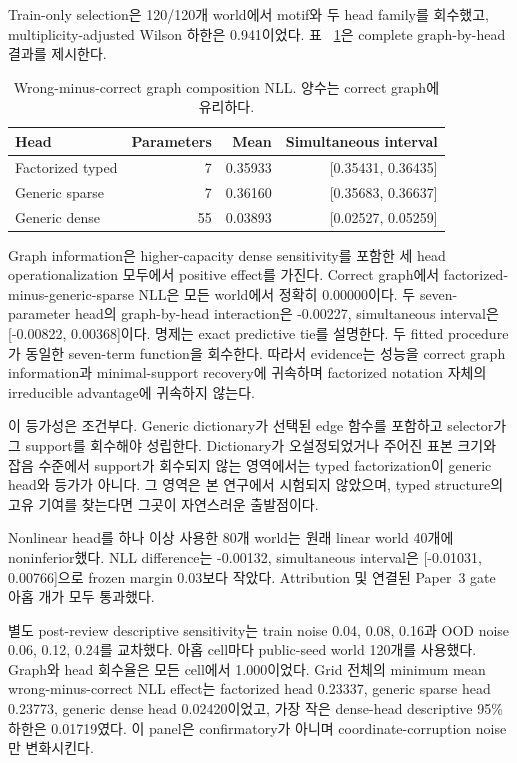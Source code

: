 Train-only selection은 120/120개 world에서 motif와 두 head family를 회수했고,
multiplicity-adjusted Wilson 하한은 0.941이었다. 표
~\ref{tab:prospective-attribution}은 complete graph-by-head 결과를 제시한다.

\begin{table}[ht]
\centering
\caption{Wrong-minus-correct graph composition NLL. 양수는 correct graph에
유리하다.}
\label{tab:prospective-attribution}
\begin{tabular}{lrrr}
\toprule
Head & Parameters & Mean & Simultaneous interval \\
\midrule
Factorized typed & 7 & 0.35933 & [0.35431, 0.36435] \\
Generic sparse & 7 & 0.36160 & [0.35683, 0.36637] \\
Generic dense & 55 & 0.03893 & [0.02527, 0.05259] \\
\bottomrule
\end{tabular}
\end{table}

Graph information은 higher-capacity dense sensitivity를 포함한 세 head
operationalization 모두에서 positive effect를 가진다. Correct graph에서
factorized-minus-generic-sparse NLL은 모든 world에서 정확히 0.00000이다. 두
seven-parameter head의 graph-by-head interaction은 -0.00227, simultaneous
interval은 [-0.00822, 0.00368]이다. 명제는 exact predictive tie를 설명한다. 두
fitted procedure가 동일한 seven-term function을 회수한다. 따라서 evidence는
성능을 correct graph information과 minimal-support recovery에 귀속하며 factorized
notation 자체의 irreducible advantage에 귀속하지 않는다.

이 등가성은 조건부다. Generic dictionary가 선택된 edge 함수를 포함하고 selector가
그 support를 회수해야 성립한다. Dictionary가 오설정되었거나 주어진 표본 크기와 잡음
수준에서 support가 회수되지 않는 영역에서는 typed factorization이 generic head와
등가가 아니다. 그 영역은 본 연구에서 시험되지 않았으며, typed structure의 고유
기여를 찾는다면 그곳이 자연스러운 출발점이다.

Nonlinear head를 하나 이상 사용한 80개 world는 원래 linear world 40개에
noninferior했다. NLL difference는 -0.00132, simultaneous interval은
[-0.01031, 0.00766]으로 frozen margin 0.03보다 작았다. Attribution 및 연결된
Paper~3 gate 아홉 개가 모두 통과했다.

별도 post-review descriptive sensitivity는 train noise 0.04, 0.08, 0.16과
OOD noise 0.06, 0.12, 0.24를 교차했다. 아홉 cell마다 public-seed world 120개를
사용했다. Graph와 head 회수율은 모든 cell에서
1.000이었다. Grid 전체의 minimum mean wrong-minus-correct NLL effect는 factorized
head 0.23337, generic sparse head 0.23773, generic dense head 0.02420이었고, 가장
작은 dense-head descriptive 95\% 하한은 0.01719였다. 이 panel은 confirmatory가
아니며 coordinate-corruption noise만 변화시킨다.

